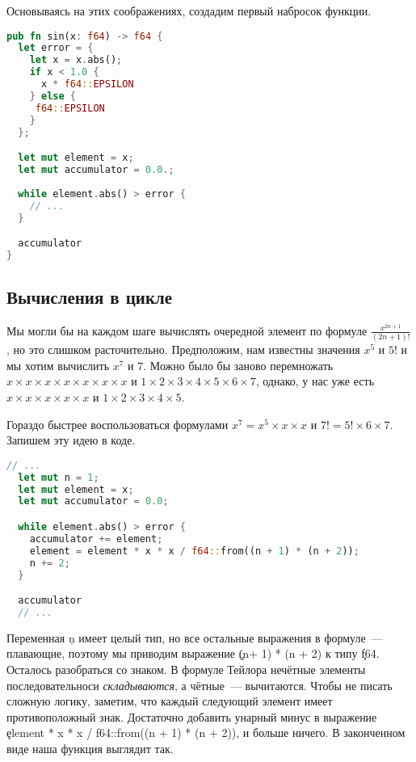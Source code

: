 Основываясь на этих соображениях, создадим первый набросок функции.

\begin{lstlisting}[language=Rust]
pub fn sin(x: f64) -> f64 {
  let error = {
    let x = x.abs();
    if x < 1.0 {
      x * f64::EPSILON
    } else {
     f64::EPSILON
    }
  };

  let mut element = x;
  let mut accumulator = 0.0.;
    
  while element.abs() > error {
    // ...
  }

  accumulator
}
\end{lstlisting}

\subsection{Вычисления в цикле}

Мы могли бы на каждом шаге вычислять очередной элемент по формуле $\frac{x^{2n + 1}}{(2n + 1)!}$, но это слишком расточительно.
Предположим, нам известны значения $x^5$ и $5!$ и мы хотим вычислить $x^7$ и $7$.
Можно было бы заново перемножать $x\times x\times x\times x\times x\times x\times x$ и $1\times 2\times 3\times 4\times 5\times 6\times 7$, однако, у нас уже есть $x\times x\times x\times x\times x$ и $1\times 2\times 3\times 4\times 5$.

Гораздо быстрее воспользоваться формулами $x^7 = x^5\times x\times x$ и $7! = 5!\times 6\times 7$.
Запишем эту идею в коде.

\begin{lstlisting}[language=Rust]
  // ...
  let mut n = 1;
  let mut element = x;
  let mut accumulator = 0.0;

  while element.abs() > error {
    accumulator += element;
    element = element * x * x / f64::from((n + 1) * (n + 2));
    n += 2;
  }

  accumulator
  // ...
\end{lstlisting}

Переменная \c{n} имеет целый тип, но все остальные выражения в формуле~--- плавающие, поэтому мы приводим выражение \c{(n+ 1) * (n + 2)} к типу \c{f64}.
Осталось разобраться со знаком.
В формуле Тейлора нечётные элементы последовательноси {\em складываются}, а чётные~--- вычитаются.
Чтобы не писать сложную логику, заметим, что каждый следующий элемент имеет противоположный знак.
Достаточно добавить унарный минус в выражение \c{element * x * x / f64::from((n + 1) * (n + 2))}, и больше ничего.
В законченном виде наша функция выглядит так.

